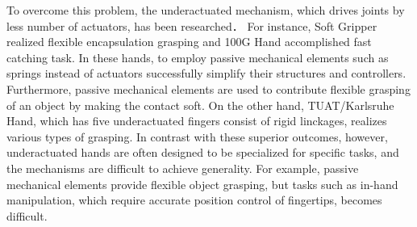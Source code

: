 \documentclass{llncs}
\begin{document}

To overcome this problem, the underactuated mechanism, which drives
joints by less number of actuators, has been researched\cite{Birglen2008}．
For instance, Soft Gripper realized flexible encapsulation
grasping\cite{Hirose1978} and 100G Hand accomplished fast catching
task\cite{Kaneko2003}.
In these hands, to employ passive mechanical elements such as springs
instead of actuators successfully simplify their structures and
controllers.
Furthermore, passive mechanical elements are used to contribute flexible
grasping of an object by making the contact soft.
On the other hand, TUAT/Karlsruhe Hand, which has five underactuated
fingers consist of rigid linckages, realizes various types of
grasping\cite{Fukaya2013}.
In contrast with these superior outcomes, however, underactuated hands
are often designed to be specialized for specific tasks, and the
mechanisms are difficult to achieve generality.
For example, passive mechanical elements provide flexible object
grasping, but tasks such as in-hand manipulation, which require accurate
position control of fingertips, becomes difficult.
\end{document}
